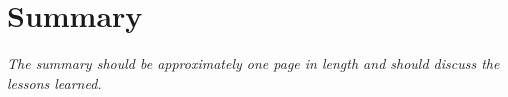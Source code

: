 \chapter{Summary}
\label{cha:summary_outlook}

\textit{The summary should be approximately one page in length and should discuss the lessons learned.}